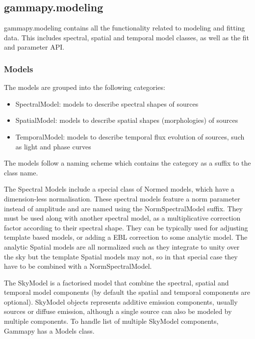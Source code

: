 \subsection{gammapy.modeling}
\label{ssec:gammapy-modeling}

gammapy.modeling contains all the functionality related to modeling and fitting
data. This includes spectral, spatial and temporal model classes, as well as
the fit and parameter API.

\subsubsection{Models}
\label{ssec:models}

The models are grouped into the following categories:

\begin{itemize}
	\item SpectralModel: models to describe spectral shapes of sources
	\item SpatialModel: models to describe spatial shapes (morphologies) of sources
	\item TemporalModel: models to describe temporal flux evolution of sources, such as
	      light and phase curves

\end{itemize}

The models follow a naming scheme which contains the category as a suffix to
the class name.

The  Spectral Models include a special class of Normed models, which have a
dimension-less normalisation. These spectral models feature a norm parameter
instead of amplitude and are named using the NormSpectralModel suffix. They
must be used along with another spectral model, as a multiplicative correction
factor according to their spectral shape. They can be typically used for
adjusting template based models, or adding a EBL correction to some analytic
model. The analytic Spatial models are all normalized such as they integrate to
unity over the sky but the template Spatial models may not, so in that special
case they have to be combined with a NormSpectralModel.

The SkyModel is a factorised model that combine the spectral, spatial and
temporal model components (by default the spatial and temporal components are
optional). SkyModel objects represents additive emission components, usually
sources or diffuse emission, although a single source can also be modeled by
multiple components. To handle list of multiple SkyModel components, Gammapy
has a Models class.

